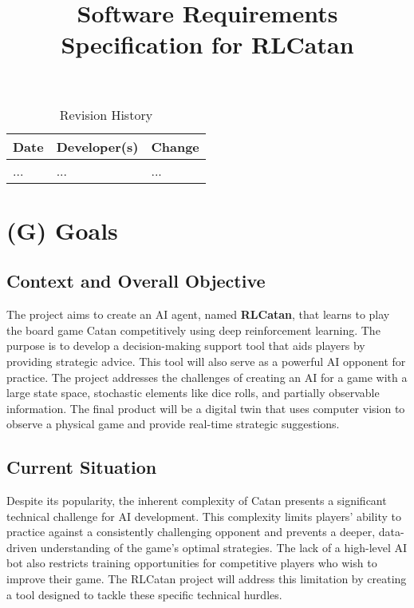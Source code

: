 \documentclass{article}
\title{Software Requirements Specification for RLCatan\\\progname}
\author{\authname}
\date{}
\begin{document}
\maketitle

\begin{table}[hp]
\caption{Revision History} \label{TblRevisionHistory}
\begin{tabularx}{\textwidth}{llX}
\toprule
\textbf{Date} & \textbf{Developer(s)} & \textbf{Change}\\
\midrule
... & ... & ...\\
\bottomrule
\end{tabularx}
\end{table}

\section*{(G) Goals}\label{sec:srs-goals}
\renewcommand{\thesubsection}{G.\arabic{subsection}}

\subsection{Context and Overall Objective}\label{subsec:context-and-overall-objective}
The project aims to create an AI agent, named \textbf{RLCatan}, that learns to play the board game Catan competitively using deep reinforcement learning. The purpose is to develop a decision-making support tool that aids players by providing strategic advice. This tool will also serve as a powerful AI opponent for practice. The project addresses the challenges of creating an AI for a game with a large state space, stochastic elements like dice rolls, and partially observable information. The final product will be a digital twin that uses computer vision to observe a physical game and provide real-time strategic suggestions.

\subsection{Current Situation}\label{subsec:current-situation}
Despite its popularity, the inherent complexity of Catan presents a significant technical challenge for AI development. This complexity limits players' ability to practice against a consistently challenging opponent and prevents a deeper, data-driven understanding of the game's optimal strategies. The lack of a high-level AI bot also restricts training opportunities for competitive players who wish to improve their game. The RLCatan project will address this limitation by creating a tool designed to tackle these specific technical hurdles.
\end{document}
